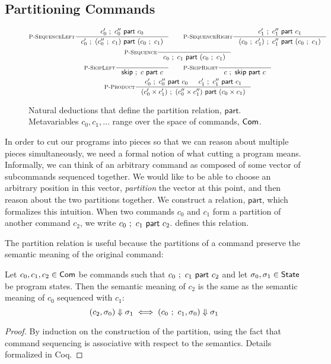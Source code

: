 \documentclass[p.tex]{subfiles}
\begin{document}
\subsection{Partitioning Commands}\label{sec:partition}
\begin{figure}
\begin{spreadlines}{5pt}
\begin{gather*}
  \inference[\textsc{P-SequenceLeft}]{%
    \relpart{c_0'}{c_0''}{c_0}
  }{%
    \relpart{c_0'}{(\cseq{c_0''}{c_1})}{(\cseq{c_0}{c_1})}
  }
  \qquad
  \inference[\textsc{P-SequenceRight}]{%
    \relpart{c_1'}{c_1''}{c_1}
  }{%
    \relpart{(\cseq{c_0}{c_1'})}{c_1''}{(\cseq{c_0}{c_1})}
  }
  \\
  \inference[\textsc{P-Sequence}]{%
  }{%
    \relpart{c_0}{c_1}{(\cseq{c_0}{c_1})}
  }
  \\
  \inference[\textsc{P-SkipLeft}]{%
  }{%
    \relpart{\cskip}{c}{c}
  }
  \qquad
  \inference[\textsc{P-SkipRight}]{%
  }{%
    \relpart{c}{\cskip}{c}
  }
  \\
  \inference[\textsc{P-Product}]{%
    \relpart{c_0'}{c_0''}{c_0}&
    \relpart{c_1'}{c_1''}{c_1}
  }{%
    \relpart{(\cprod{c_0'}{c_1'})}{(\cprod{c_0''}{c_1''})}{(\cprod{c_0}{c_1})}
  }
\end{gather*}
\end{spreadlines}
\caption{%
  Natural deductions that define the partition relation,
  $\textsf{part}$. Metavariables $c_0, c_1, \ldots$ range over the
  space of commands, $\textsf{Com}$.
}\label{fig:partition}
\end{figure}

In order to cut our programs into pieces so that we can reason about
multiple pieces simultaneously, we need a formal notion of what
cutting a program means. Informally, we can think of an arbitrary
command as composed of some vector of subcommands sequenced
together. We would like to be able to choose an arbitrary position
in this vector, \emph{partition} the vector at this point, and then
reason about the two partitions together.
%
We construct a relation, $\textsf{part}$, which formalizes this
intuition. When two commands $c_0$ and $c_1$ form a partition of
another command $c_2$, we write $c_0~;~c_1~\textsf{part}~c_2$.
 defines this relation.

The partition relation is useful because the partitions of a command
preserve the semantic meaning of the original command:
\begin{theorem}
  Let $c_0, c_1, c_2 \in \textsf{Com}$ be commands such that
  $c_0~;~c_1~\textsf{part}~c_2$ and let $\sigma_0, \sigma_1 \in
  \textsf{State}$ be program states. Then the semantic meaning of $c_2$ is
  the same as the semantic meaning of $c_0$ sequenced with $c_1$:
  \[
  (c_2, \sigma_0) \Downarrow \sigma_1
  \iff
  (c_0~;~c_1, \sigma_0) \Downarrow \sigma_1
  \]
\end{theorem}
\begin{proof}
  By induction on the construction of the partition, using
  the fact that command sequencing is associative with respect
  to the semantics. Details formalized in Coq.
\end{proof}
\end{document}
